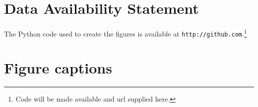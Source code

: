 \documentclass[utf8]{frontiersSCNS} %
\begin{document}

\section*{Data Availability Statement}
 The Python code used to create the figures is available at \texttt{http://github.com}.\footnote{Code will be made available and
  url supplied here.}





\section*{Figure captions}

\end{document}
